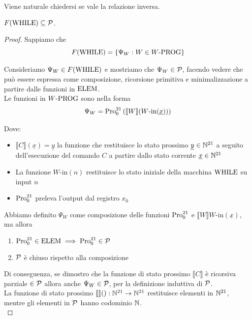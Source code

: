 Viene naturale chiedersi se vale la relazione inversa.\\

\begin{theor}
	$F(\text{WHILE}) \subseteq \mathcal{P}$.
\end{theor}
\begin{proof}
	Sappiamo che
	$$ F(\text{WHILE}) = \{\Psi_W: W \in W\text{-PROG}\}$$
	
	Consideriamo $\Psi_W \in F(\text{WHILE})$ e mostriamo che $\Psi_W \in \mathcal{P}$, facendo vedere che può essere espressa come composizione, ricorsione primitiva e minimalizzazione a partire dalle funzioni in $\text{ELEM}$.\\
	
	Le funzioni in $W\text{-PROG}$ sono nella forma
	$$ \Psi_W = \text{Pro}_0^{21} \left( \llbracket W \rrbracket (W\text{-in}(\underline{x})) \right) $$
	
	Dove: 
	\begin{itemize}
		\item $\llbracket C \rrbracket (\underline{x}) = \underline{y}$ la funzione che restituisce lo stato prossimo $\underline{y} \in \mathbb{N}^{21}$ a seguito dell'esecuzione del comando $C$ a partire dallo stato corrente $\underline{x} \in \mathbb{N}^{21}$
		
		\item La funzione $W\text{-in}(n)$ restituisce lo stato iniziale della macchina $\text{WHILE}$ su input $n$
		
		\item $\text{Pro}_0^{21}$ preleva l'output dal registro $x_0$
	\end{itemize}
	
	Abbiamo definito $\Psi_W$ come composizione delle funzioni $\text{Pro}_0^{21}$ e $\llbracket W \rrbracket W \text{-in}(\underline{x})$, ma allora
	\begin{enumerate}
		\item $\text{Pro}_0^{21} \in \text{ELEM} \implies \text{Pro}_0^{21} \in \mathcal{P}$
		\item $\mathcal{P}$ è chiuso rispetto alla composizione
	\end{enumerate}
	Di conseguenza, se dimostro che la funzione di stato prossimo $\llbracket C \rrbracket$ è ricorsiva parziale $\in \mathcal{P}$ allora anche $\Psi_W \in \mathcal{P}$, per la definizione induttiva di $\mathcal{P}$.\\
	
	La funzione di stato prossimo $\llbracket \rrbracket (): \mathbb{N}^{21} \rightarrow \mathbb{N}^{21}$ restituisce elementi in $\mathbb{N}^{21}$, mentre gli elementi in $\mathcal{P}$ hanno codominio $\mathbb{N}$. \\
	

\end{proof}
